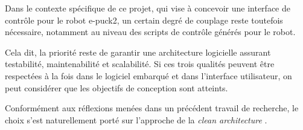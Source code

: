 Dans le contexte spécifique de ce projet, qui vise à concevoir une interface de contrôle pour le robot e-puck2, un certain degré de couplage reste toutefois nécessaire, notamment au niveau des scripts de contrôle générés pour le robot.

Cela dit, la priorité reste de garantir une architecture logicielle assurant testabilité, maintenabilité et scalabilité. Si ces trois qualités peuvent être respectées à la fois dans le logiciel embarqué et dans l'interface utilisateur, on peut considérer que les objectifs de conception sont atteints.

Conformément aux réflexions menées dans un précédent travail de recherche, le choix s’est naturellement porté sur l’approche de la \textit{clean architecture} \autocite{tinael_devresse_analyse_2023}.
